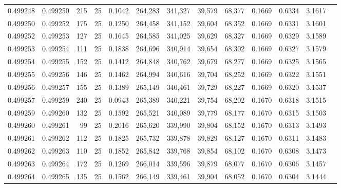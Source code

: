 \begin{tabular}{rrrrrrrrrrrrr}
0.499248 & 0.499250 & 215 &  25 &                                     0.1042 & 264,283 & 341,327 &  39,579 &  68,377 & 0.1669 & 0.6334 & 3.1617 \\
0.499250 & 0.499252 & 175 &  25 &                                     0.1250 & 264,458 & 341,152 &  39,604 &  68,352 & 0.1669 & 0.6331 & 3.1601 \\
0.499252 & 0.499253 & 127 &  25 &                                     0.1645 & 264,585 & 341,025 &  39,629 &  68,327 & 0.1669 & 0.6329 & 3.1589 \\
0.499253 & 0.499254 & 111 &  25 &                                     0.1838 & 264,696 & 340,914 &  39,654 &  68,302 & 0.1669 & 0.6327 & 3.1579 \\
0.499254 & 0.499255 & 152 &  25 &                                     0.1412 & 264,848 & 340,762 &  39,679 &  68,277 & 0.1669 & 0.6325 & 3.1565 \\
0.499255 & 0.499256 & 146 &  25 &                                     0.1462 & 264,994 & 340,616 &  39,704 &  68,252 & 0.1669 & 0.6322 & 3.1551 \\
0.499256 & 0.499257 & 155 &  25 &                                     0.1389 & 265,149 & 340,461 &  39,729 &  68,227 & 0.1669 & 0.6320 & 3.1537 \\
0.499257 & 0.499259 & 240 &  25 &                                     0.0943 & 265,389 & 340,221 &  39,754 &  68,202 & 0.1670 & 0.6318 & 3.1515 \\
0.499259 & 0.499260 & 132 &  25 &                                     0.1592 & 265,521 & 340,089 &  39,779 &  68,177 & 0.1670 & 0.6315 & 3.1503 \\
0.499260 & 0.499261 &  99 &  25 &                                     0.2016 & 265,620 & 339,990 &  39,804 &  68,152 & 0.1670 & 0.6313 & 3.1493 \\
0.499261 & 0.499262 & 112 &  25 &                                     0.1825 & 265,732 & 339,878 &  39,829 &  68,127 & 0.1670 & 0.6311 & 3.1483 \\
0.499262 & 0.499263 & 110 &  25 &                                     0.1852 & 265,842 & 339,768 &  39,854 &  68,102 & 0.1670 & 0.6308 & 3.1473 \\
0.499263 & 0.499264 & 172 &  25 &                                     0.1269 & 266,014 & 339,596 &  39,879 &  68,077 & 0.1670 & 0.6306 & 3.1457 \\
0.499264 & 0.499265 & 135 &  25 &                                     0.1562 & 266,149 & 339,461 &  39,904 &  68,052 & 0.1670 & 0.6304 & 3.1444 \\

\end{tabular}
